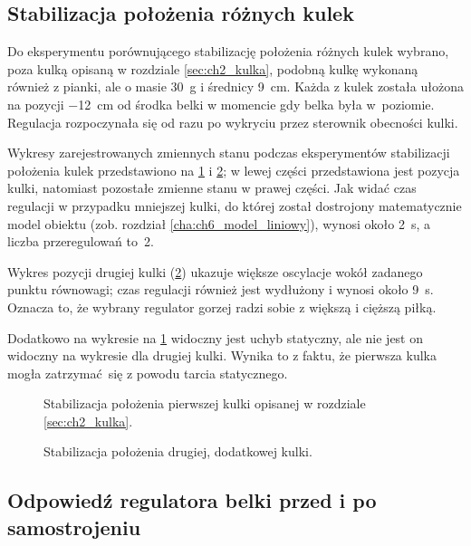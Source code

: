 \subsection{Stabilizacja położenia różnych kulek}
\label{subsec:ch9_stabilizacja_polozenia_roznych_kulek}

Do eksperymentu porównującego stabilizację położenia różnych kulek wybrano, poza kulką opisaną w rozdziale \ref{sec:ch2_kulka}, podobną kulkę wykonaną również z pianki, ale o masie \SI{30}{\gram} i średnicy \SI{9}{\centi\meter}. Każda z kulek została ułożona na pozycji \SI{-12}{\centi\meter} od środka belki w momencie gdy belka była w~poziomie. Regulacja rozpoczynała się od razu po wykryciu przez sterownik obecności kulki.

Wykresy zarejestrowanych zmiennych stanu podczas eksperymentów stabilizacji położenia kulek przedstawiono na \cref{fig:stabilizacja_kulka1} i \cref{fig:stabilizacja_kulka2}; w lewej części przedstawiona jest pozycja kulki, natomiast pozostałe zmienne stanu w prawej części. Jak widać czas regulacji w przypadku mniejszej kulki, do której został dostrojony matematycznie model obiektu (zob. rozdział \ref{cha:ch6_model_liniowy}), wynosi około \SI{2}{\second}, a liczba przeregulowań to~2.

Wykres pozycji drugiej kulki (\cref{fig:stabilizacja_kulka2}) ukazuje większe oscylacje wokół zadanego punktu równowagi; czas regulacji również jest wydłużony i wynosi około \SI{9}{\second}. Oznacza to, że wybrany regulator gorzej radzi sobie z większą i cięższą piłką.

Dodatkowo na wykresie na \cref{fig:stabilizacja_kulka1} widoczny jest uchyb statyczny, ale nie jest on widoczny na wykresie dla drugiej kulki. Wynika to z faktu, że pierwsza kulka mogła zatrzymać się z powodu tarcia statycznego.

\begin{figure}[p]
    
    \caption{Stabilizacja położenia pierwszej kulki opisanej w rozdziale \ref{sec:ch2_kulka}.}
    \label{fig:stabilizacja_kulka1}
\end{figure}
\begin{figure}[p]
    
    \caption{Stabilizacja położenia drugiej, dodatkowej kulki.}
    \label{fig:stabilizacja_kulka2}
\end{figure}

\subsection{Odpowiedź regulatora belki przed i po samostrojeniu}
\label{subsec:ch9_odp_regulatora_belki}

